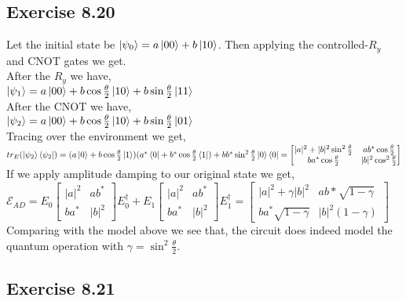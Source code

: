 \documentclass[a4paper,12pt]{article}
\begin{document}
\subsection*{Exercise 8.20}
Let the initial state be $\ket{\psi_0}=a\ket{00}+b\ket{10}$. Then applying the controlled-$R_y$ and CNOT gates we get.\\
After the $R_y$ we have,\\
$\ket{\psi_1}=a\ket{00}+b\cos{\frac{\theta}{2}}\ket{10}+b\sin{\frac{\theta}{2}}\ket{11}$\\
After the CNOT we have,\\
$\ket{\psi_2}=a\ket{00}+b\cos{\frac{\theta}{2}}\ket{10}+b\sin{\frac{\theta}{2}}\ket{01}$\\
Tracing over the environment we get,\\
$tr_E(\ket{\psi_2}\bra{\psi_2})=(a\ket{0}+b\cos{\frac{\theta}{2}}\ket{1})(a^*\bra{0}+b^*\cos{\frac{\theta}{2}}\bra{1})+
bb^*\sin^2{\frac{\theta}{2}}\ket{0}\bra{0}=
\begin{bmatrix}
    |a|^2+|b|^2\sin^2{\frac{\theta}{2}} & ab^*\cos{\frac{\theta}{2}}\\
    ba^*\cos{\frac{\theta}{2}} &    |b|^2\cos^2{\frac{\theta}{2}}
\end{bmatrix}$\\
If we apply amplitude damping to our original state we get,\\
$\mathcal{E}_{AD}=E_0
\begin{bmatrix}
    |a|^2&ab^*\\
    ba^*& |b|^2
\end{bmatrix}
E_0^\dagger +E_1
\begin{bmatrix}
    |a|^2&ab^*\\
    ba^*& |b|^2
\end{bmatrix}
E_1^\dagger=
\begin{bmatrix}
    |a|^2+\gamma|b|^2& ab*\sqrt{1-\gamma}\\
    ba^*\sqrt{1-\gamma} & |b|^2(1-\gamma)
\end{bmatrix}$\\
Comparing with the model above we see that, the circuit does indeed model the quantum operation
with $\gamma=\sin^2{\frac{\theta}{2}}$.
\subsection*{Exercise 8.21}
\end{document}
